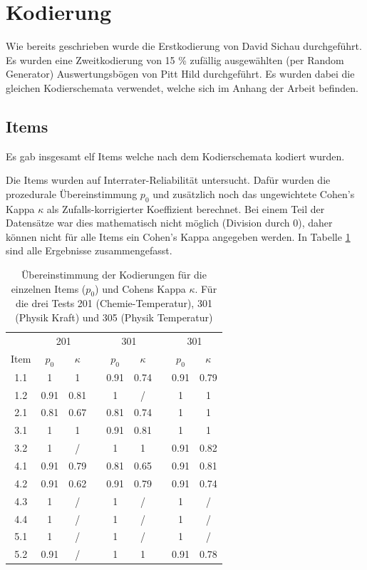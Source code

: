 \section{Kodierung}

Wie bereits geschrieben wurde die Erstkodierung von David Sichau durchgeführt. Es wurden eine Zweitkodierung von  15 \% zufällig ausgewählten (per Random Generator) Auswertungsbögen von Pitt Hild  durchgeführt. Es wurden dabei die gleichen Kodierschemata verwendet, welche sich im Anhang der Arbeit befinden. %

\subsection{Items}
Es gab insgesamt elf Items welche nach dem Kodierschemata kodiert wurden.

Die Items wurden auf Interrater-Reliabilität untersucht. Dafür wurden die prozedurale Übereinstimmung $p_0$ und zusätzlich noch das ungewichtete Cohen's Kappa $\kappa$ als Zufalls-korrigierter Koeffizient berechnet. Bei einem Teil der Datensätze war dies mathematisch nicht möglich (Division durch 0), daher können nicht für alle Items ein Cohen's Kappa angegeben werden. In Tabelle \ref{tab:CohenKappa} sind alle Ergebnisse zusammengefasst.



\begin{table}[htbp]
  \centering
\begin{tabular}{ccccccccc}
\toprule   &  \multicolumn{2}{c}{201} &&  \multicolumn{2}{c}{301}  && \multicolumn{2}{c}{301}\\
Item  & $p_0$ & $\kappa$ &&  $p_0$ & $\kappa$ &&  $p_0$ & $\kappa$\\
\midrule
 1.1 & 1 & 1  && 0.91 & 0.74 && 0.91 & 0.79 \\ 
 1.2 & 0.91 & 0.81  && 1 & /  && 1 & 1 \\ 
 2.1 & 0.81 & 0.67  && 0.81 & 0.74  && 1 & 1\\ 
 3.1 & 1 & 1  && 0.91 & 0.81  && 1 & 1\\ 
 3.2 & 1 & /  && 1 & 1  && 0.91 & 0.82\\ 
 4.1 & 0.91 & 0.79 && 0.81 & 0.65  && 0.91 & 0.81 \\ 
 4.2 & 0.91 & 0.62 && 0.91 & 0.79  && 0.91 & 0.74 \\ 
 4.3 & 1 & /  && 1 & /  && 1 & / \\ 
 4.4 & 1 & /  && 1 & /  && 1 & / \\ 
 5.1 & 1 & /  && 1 & /  && 1 & / \\ 
 5.2 & 0.91 & /  && 1 & 1  && 0.91 & 0.78 \\ 

\bottomrule

\end{tabular} 
  \caption{Übereinstimmung der Kodierungen für die einzelnen Items ($p_0$) und Cohens Kappa $\kappa$. Für die drei Tests 201 (Chemie-Temperatur), 301 (Physik Kraft) und 305 (Physik Temperatur)}
  \label{tab:CohenKappa}
\end{table}

